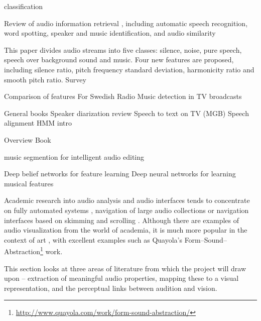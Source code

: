 classification

Review of audio information retrieval \citep{Foote1999}, including automatic speech recognition, word spotting, speaker
and music identification, and audio similarity

This paper divides audio streams into five classes: silence, noise, pure speech, speech over background sound and
music. Four new features are proposed, including silence ratio, pitch frequency standard deviation, harmonicity ratio
and smooth pitch ratio. \citep{Liang2005}
Survey \citep{Duan2014}

Comparison of features \citep{Carey1999}
For Swedish Radio \citep{Ericsson2009}
Music detection in TV broadcasts \citep{Seyerlehner2007}

General books \citep{Junqua1995,Lee1999a}
Speaker diarization review \citep{AngueraMiro2012}
Speech to text on TV (MGB) \citep{Bell2015}
Speech alignment \citep{Bohac2013}
HMM intro \citep{Rabiner1989}

\citep{Tranter2006}

Overview \citep{Doddington1985}
Book \citep{Lee1999a}

music segmention for intelligent audio editing \citep{Fazekas2007}

Deep belief networks for feature learning \citep{Hamel2010}
Deep neural networks for learning musical features \citep{Sigtia2014}


Academic research into audio analysis and audio interfaces tends to concentrate on fully automated systems
\citep{AngueraMiro2012}, navigation of large audio collections \citep{FontCorbera2010} or navigation interfaces based
on skimming \citep{Arons1997} and scrolling \citep{Lee2007}. Although there are examples of audio visualization from
the world of academia, it is much more popular in the context of art \citep{Armitage2012}, with excellent examples such
as Quayola's Form--Sound--Abstraction\footnote{\url{http://www.quayola.com/work/form-sound-abstraction/}} work.

This section looks at three areas of literature from which the project will draw upon -- extraction of meaningful audio
properties, mapping these to a visual representation, and the perceptual links between audition and vision.


